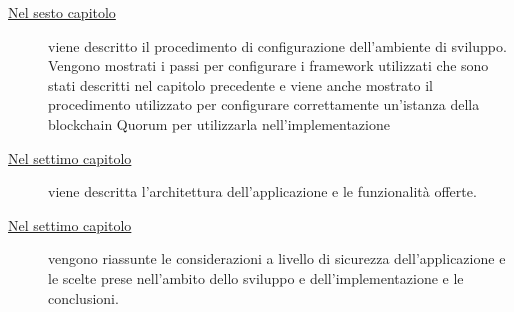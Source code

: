 \begin{description}
	\item[{\hyperref[cap:configurazione]{Nel sesto capitolo}}] viene descritto il procedimento di configurazione dell'ambiente di sviluppo. Vengono mostrati i passi per configurare i framework utilizzati che sono stati descritti nel capitolo precedente e viene anche mostrato il procedimento utilizzato per configurare correttamente un'istanza della blockchain Quorum per utilizzarla nell'implementazione
	\item[{\hyperref[cap:implementazione]{Nel settimo capitolo}}] viene descritta l'architettura dell'applicazione e le funzionalità offerte.
	\item[{\hyperref[cap:conclusioni]{Nel settimo capitolo}}] vengono riassunte le considerazioni a livello di sicurezza dell'applicazione e le scelte prese nell'ambito dello sviluppo e dell'implementazione e le conclusioni.
\end{description}
%
